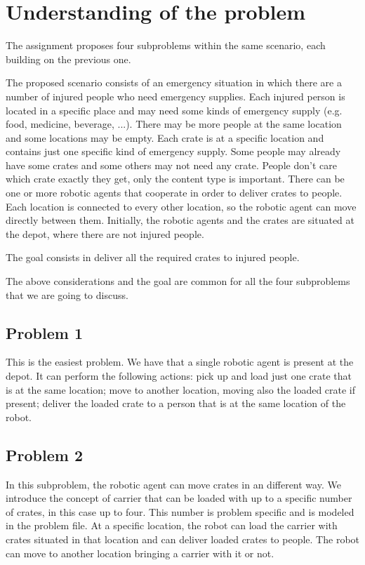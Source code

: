 
\section{Understanding of the problem}
\label{sec2}

The assignment proposes four subproblems within the same scenario, each building on the previous one.

The proposed scenario consists of an emergency situation in which there are a number of injured people 
who need emergency supplies.
Each injured person is located in a specific place and may need some kinds of emergency supply
(e.g. food, medicine, beverage, ...). There may be more people at the same location and some 
locations may be empty.
Each crate is at a specific location and contains just one specific kind of emergency supply.
Some people may already have some crates and some others may not need any crate.
People don't care which crate exactly they get, only the content type is important.
There can be one or more robotic agents that cooperate in order to deliver crates to people.
Each location is connected to every other location, so the robotic agent can move directly between them.
Initially, the robotic agents and the crates are situated at the depot, where there are not injured people.

The goal consists in deliver all the required crates to injured people.

The above considerations and the goal are common for all the four subproblems that we are going to discuss.

\subsection{Problem 1}
This is the easiest problem.
We have that a single robotic agent is present at the depot.
It can perform the following actions: pick up and load just one crate that is at the same location;
move to another location, moving also the loaded crate if present; 
deliver the loaded crate to a person that is at the same location of the robot.

\subsection{Problem 2}
In this subproblem, the robotic agent can move crates in an different way.
We introduce the concept of carrier that can be loaded with up to a specific number of crates, 
in this case up to four.
This number is problem specific and is modeled in the problem file.
At a specific location, the robot can load the carrier with crates situated in that location and can
deliver loaded crates to people.
The robot can move to another location bringing a carrier with it or not.

